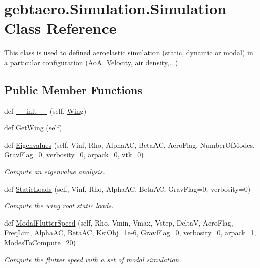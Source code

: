 \hypertarget{classgebtaero_1_1_simulation_1_1_simulation}{}\section{gebtaero.\+Simulation.\+Simulation Class Reference}
\label{classgebtaero_1_1_simulation_1_1_simulation}


This class is used to defined aeroelastic simulation (static, dynamic or modal) in a particular configuration (AoA, Velocity, air density,...)  


\subsection*{Public Member Functions}
\begin{DoxyCompactItemize}
\item 
def \hyperlink{classgebtaero_1_1_simulation_1_1_simulation_a865b25fd48ff7aded232e634e28679c3}{\+\_\+\+\_\+init\+\_\+\+\_\+} (self, \hyperlink{classgebtaero_1_1_wing_1_1_wing}{Wing})
\item 
def \hyperlink{classgebtaero_1_1_simulation_1_1_simulation_a2d7432b48522221861693e98b03568c4}{Get\+Wing} (self)
\item 
def \hyperlink{classgebtaero_1_1_simulation_1_1_simulation_a03a37673e2e1c67de5eaeb261512d122}{Eigenvalues} (self, Vinf, Rho, Alpha\+AC, Beta\+AC, Aero\+Flag, Number\+Of\+Modes, Grav\+Flag=0, verbosity=0, arpack=0, vtk=0)
\begin{DoxyCompactList}\small\item\em Compute an eigenvalue analysis. \end{DoxyCompactList}\item 
def \hyperlink{classgebtaero_1_1_simulation_1_1_simulation_a36da2334a6e743a9ab29bdfe1334ed04}{Static\+Loads} (self, Vinf, Rho, Alpha\+AC, Beta\+AC, Grav\+Flag=0, verbosity=0)
\begin{DoxyCompactList}\small\item\em Compute the wing root static loads. \end{DoxyCompactList}\item 
def \hyperlink{classgebtaero_1_1_simulation_1_1_simulation_ab62864a7bf462387f4cbe24b061b803a}{Modal\+Flutter\+Speed} (self, Rho, Vmin, Vmax, Vstep, DeltaV, Aero\+Flag, Freq\+Lim, Alpha\+AC, Beta\+AC, Ksi\+Obj=1e-\/6, Grav\+Flag=0, verbosity=0, arpack=1, Modes\+To\+Compute=20)
\begin{DoxyCompactList}\small\item\em Compute the flutter speed with a set of modal simulation. \end{DoxyCompactList}\item 

\end{DoxyCompactItemize}
